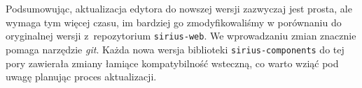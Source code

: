 Podsumowując, aktualizacja edytora do nowszej wersji zazwyczaj jest prosta, ale
wymaga tym więcej czasu, im bardziej go zmodyfikowaliśmy w porównaniu do
oryginalnej wersji z~repozytorium \texttt{sirius-web}. We wprowadzaniu zmian
znacznie pomaga narzędzie \emph{git}. Każda nowa wersja biblioteki
\texttt{sirius-components} do tej pory zawierała zmiany łamiące kompatybilność
wsteczną, co warto wziąć pod uwagę planując proces aktualizacji.

